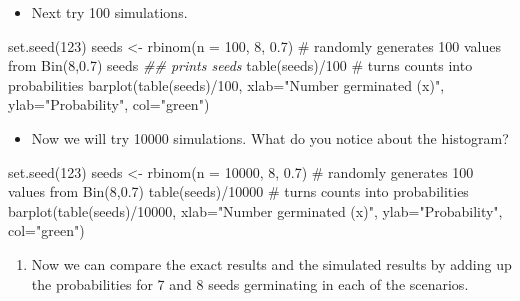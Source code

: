 \documentclass[
  10pt,
  letterpaper,
  DIV=11,
  numbers=noendperiod]{scrartcl}
\newenvironment{Shaded}{\begin{snugshade}}{\end{snugshade}}
\newcommand{\AttributeTok}[1]{\textcolor[rgb]{0.40,0.45,0.13}{#1}}
\newcommand{\CommentTok}[1]{\textcolor[rgb]{0.37,0.37,0.37}{#1}}
\newcommand{\DecValTok}[1]{\textcolor[rgb]{0.68,0.00,0.00}{#1}}
\newcommand{\DocumentationTok}[1]{\textcolor[rgb]{0.37,0.37,0.37}{\textit{#1}}}
\newcommand{\FloatTok}[1]{\textcolor[rgb]{0.68,0.00,0.00}{#1}}
\newcommand{\FunctionTok}[1]{\textcolor[rgb]{0.28,0.35,0.67}{#1}}
\newcommand{\NormalTok}[1]{\textcolor[rgb]{0.00,0.23,0.31}{#1}}
\newcommand{\OtherTok}[1]{\textcolor[rgb]{0.00,0.23,0.31}{#1}}
\newcommand{\SpecialCharTok}[1]{\textcolor[rgb]{0.37,0.37,0.37}{#1}}
\newcommand{\StringTok}[1]{\textcolor[rgb]{0.13,0.47,0.30}{#1}}
\providecommand{\tightlist}{%
  \setlength{\itemsep}{0pt}\setlength{\parskip}{0pt}}\usepackage{longtable,booktabs,array}
\begin{document}
\begin{itemize}
\tightlist
\item
  Next try 100 simulations.
\end{itemize}

\begin{Shaded}
\begin{Highlighting}[]
\FunctionTok{set.seed}\NormalTok{(}\DecValTok{123}\NormalTok{)}
\NormalTok{seeds }\OtherTok{\textless{}{-}} \FunctionTok{rbinom}\NormalTok{(}\AttributeTok{n =} \DecValTok{100}\NormalTok{, }\DecValTok{8}\NormalTok{, }\FloatTok{0.7}\NormalTok{) }\CommentTok{\# randomly generates 100 values from Bin(8,0.7)}
\NormalTok{seeds }\DocumentationTok{\#\# prints seeds}
\FunctionTok{table}\NormalTok{(seeds)}\SpecialCharTok{/}\DecValTok{100} \CommentTok{\# turns counts into probabilities}
\FunctionTok{barplot}\NormalTok{(}\FunctionTok{table}\NormalTok{(seeds)}\SpecialCharTok{/}\DecValTok{100}\NormalTok{, }\AttributeTok{xlab=}\StringTok{"Number germinated (x)"}\NormalTok{, }\AttributeTok{ylab=}\StringTok{"Probability"}\NormalTok{, }\AttributeTok{col=}\StringTok{"green"}\NormalTok{)}
\end{Highlighting}
\end{Shaded}

\begin{itemize}
\tightlist
\item
  Now we will try 10000 simulations. What do you notice about the
  histogram?
\end{itemize}

\begin{Shaded}
\begin{Highlighting}[]
\FunctionTok{set.seed}\NormalTok{(}\DecValTok{123}\NormalTok{)}
\NormalTok{seeds }\OtherTok{\textless{}{-}} \FunctionTok{rbinom}\NormalTok{(}\AttributeTok{n =} \DecValTok{10000}\NormalTok{, }\DecValTok{8}\NormalTok{, }\FloatTok{0.7}\NormalTok{) }\CommentTok{\# randomly generates 100 values from Bin(8,0.7)}
\FunctionTok{table}\NormalTok{(seeds)}\SpecialCharTok{/}\DecValTok{10000} \CommentTok{\# turns counts into probabilities}
\FunctionTok{barplot}\NormalTok{(}\FunctionTok{table}\NormalTok{(seeds)}\SpecialCharTok{/}\DecValTok{10000}\NormalTok{, }\AttributeTok{xlab=}\StringTok{"Number germinated (x)"}\NormalTok{, }\AttributeTok{ylab=}\StringTok{"Probability"}\NormalTok{, }\AttributeTok{col=}\StringTok{"green"}\NormalTok{)}
\end{Highlighting}
\end{Shaded}

\begin{enumerate}
\def\labelenumi{\arabic{enumi}.}
\setcounter{enumi}{4}
\tightlist
\item
  Now we can compare the exact results and the simulated results by
  adding up the probabilities for 7 and 8 seeds germinating in each of
  the scenarios.
\end{enumerate}
\end{document}

